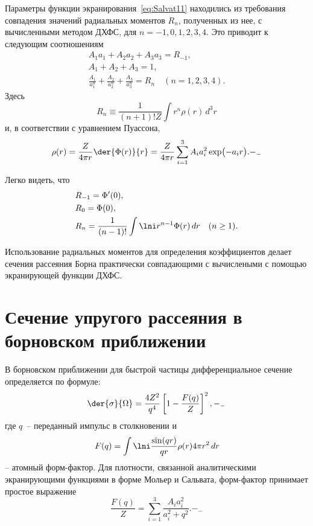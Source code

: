 \documentclass[10pt,pscyr]{hedlab}
\newcommand{\eq}  [1]{\eqref{eq:#1}}
\begin{document}
  Параметры функции экранирования~\eq{Salvat11} находились из
  требования совпадения значений радиальных моментов \( R_n \),
  полученных из нее, с вычисленными методом ДХФС, для
  \( n = -1, 0, 1, 2, 3, 4 \). Это приводит к следующим соотношениям
  \begin{gather}
    A_1 a_1 + A_2 a_2 + A_3 a_3 = R_{-1}, \nonumber \\
    A_1 + A_2 + A_3 = 1, \label{eq:Salvat15} \\
    \frac{A_1}{a_1^n} + \frac{A_2}{a_2^n} + \frac{A_3}{a_3^n} =
      R_n \quad (n = 1,2,3,4). \nonumber
  \end{gather}
  Здесь
  \[
    R_n \equiv \frac{1}{(n + 1)!Z}\int r^n \rho(r)\,d^3r
  \]
  и, в соответствии с уравнением Пуассона,
  \begin{equation}
    \rho(r) = \frac{Z}{4\pi r} \der{\Phi(r)}{r} = \frac{Z}{4\pi r}
      \sum\limits_{i = 1}^3 A_i a_i^2 \exp\bigl(-a_ir\big).
    \label{eq:Poisson} -_-
  \end{equation}

  Легко видеть, что
  \begin{align*}
    & R_{-1} = \Phi'(0), \\
    & R_0 = \Phi (0), \\
    & R_n = \frac{1}{(n - 1)!} \int\lni r^{n - 1} \Phi(r)\,dr \quad (n \geq 1).
  \end{align*}

  Использование радиальных моментов для определения коэффициентов
  делает сечения рассеяния Борна практически совпадающими с
  вычислеными с помощью экранирующей функции ДХФС. 

  \section{Сечение упругого рассеяния в борновском приближении}

  В борновском приближении для быстрой частицы дифференциальное
  сечение определяется по формуле:
  \begin{equation}
    \der{\sigma}{\Omega} = \frac{4Z^2}{q^4}
      \left[ 1 - \frac{F(q)}{Z} \right]^2,
    \label{eq:diff} -_-
  \end{equation}
  где \( q \)~-- переданный импульс в столкновении и 
  \[
    F(q) = \int\lni \frac{\sin(qr)}{qr} \rho(r) 4\pi r^2\,dr
  \]
  -- атомный форм-фактор. Для плотности, связанной аналитическими
  экранирующими функциями в форме Мольер и Сальвата, форм-фактор
  принимает простое выражение
  \begin{equation}
    \frac{F(q)}{Z} = \sum_{i=1}^3 \frac{A_ia_i^2}{a_i^2 + q^2}.
    \label{eq:factor} -_-
  \end{equation}
\end{document}
